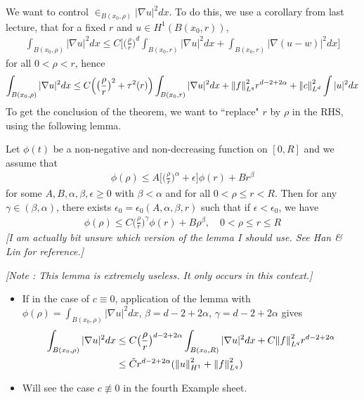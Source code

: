 \documentclass[12pt,a4paper]{article}
\begin{document}
We want to control $\in_{B(x_0, \rho)} |\nabla u|^2 dx$. To do this, we use a corollary from last lecture, that for a fixed $r$ and $u\in H^1(B(x_0, r))$,
\begin{align*}
\int_{B(x_0, \rho)}|\nabla u|^2 dx \leq C \Big[ \big( \frac{\rho}{r} \big)^d \int_{B(x_0, r)} |\nabla u|^2 dx + \int_{B(x_0, r)} |\nabla(u-w)|^2 dx \Big]
\end{align*}
for all $0< \rho <r$, hence
\begin{align*}
\int_{B(x_0, \rho)} |\nabla u|^2 dx \leq C\Big( \big(\frac{\rho}{r} \big)^2 + \tau^2(r)\Big) \int_{B(x_0, r)} |\nabla u|^2 dx + \snorms{f}{L^q}^2 r^{d-2+2\alpha} + \snorms{c}{L^d}^2 \int |u|^2 dx
\end{align*}
To get the conclusion of the theorem, we want to ``replace" $r$ by $\rho$ in the RHS, using the following lemma.
\s

\lem Let $\phi(t)$ be a non-negative and non-decreasing function on $[0, R]$ and we assume that
\begin{align*}
\phi(\rho) \leq A \Big[ \big( \frac{\rho}{r}\big)^{\alpha} + \epsilon \Big] \phi(r) + Br^{\beta}
\end{align*}
for some $A, B, \alpha, \beta, \epsilon \geq 0$ with $\beta <\alpha$ and for all $0< \rho \leq r <R$. Then for any $\gamma \in (\beta, \alpha)$, there exists $\epsilon_0 = \epsilon_0 (A, \alpha, \beta, r)$ such that if $\epsilon < \epsilon_0$, we have
\begin{align*}
\phi(\rho) \leq C\big( \frac{\rho}{r} \big)^{\gamma} \phi(r) + B \rho^{\beta}, \quad 0< \rho \leq r\leq R
\end{align*}
\emph{[I am actually bit unsure which version of the lemma I should use. See Han \& Lin for reference.]}

\emph{[Note : This lemma is extremely useless. It only occurs in this context.]}

\eos
\s

\begin{itemize}
\item If in the case of $c\equiv 0$, application of the lemma with $\phi(\rho) = \int_{B(x_0, \rho)} |\nabla u|^2 dx$, $\beta =d-2+2\alpha$, $\gamma =d-2+2\alpha$ gives
\begin{align*}
\int_{B(x_0, \rho)} |\nabla u|^2 dx & \leq C \big( \frac{\rho}{r} \big)^{d-2+2\alpha} \int_{B(x_0, R)} |\nabla u|^2 dx + C \snorms{f}{L^q}^2 r^{d-2+2\alpha} \\
& \leq \tilde{C} r^{d-2+2\alpha} (\snorms{u}{H^1}^2 + \snorms{f}{L^q}^2)
\end{align*}
\item Will see the case $c \not\equiv 0$ in the fourth Example sheet.
\end{itemize}
\s
\end{document}
